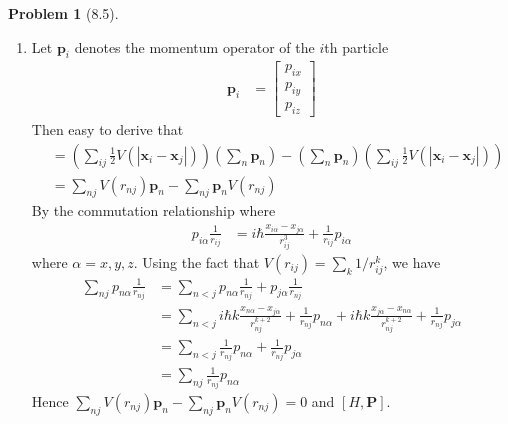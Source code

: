 \documentclass[twoside,11pt]{article}
\theoremstyle{definition}
\newtheorem{problem}{Problem}
\theoremstyle{remark}
\begin{document}
\begin{problem}[8.5]\
\begin{enumerate}[label=(\alph*)]
\item Let $\mathbf{p}_i$ denotes the momentum operator of the $i$th particle
\begin{align*}
    \mathbf{p}_i &= \begin{bmatrix}
        p_{ix}\\ p_{iy}\\ p_{iz}
    \end{bmatrix}
\end{align*}
Then easy to derive that
\begin{align*}
    [H, \mathbf{P}] &= 
    \left(\sum_{ij}\frac{1}{2}V(|\mathbf{x}_i-\mathbf{x}_j|)\right)
    \left(\sum_n \mathbf{p}_n\right) - 
    \left(\sum_n \mathbf{p}_n\right)
    \left(\sum_{ij}\frac{1}{2}V(|\mathbf{x}_i-\mathbf{x}_j|)\right)\\
    &=
    \sum_{nj}
    V(r_{nj})
    \mathbf{p}_n
    -
    \sum_{nj}
    \mathbf{p}_n
    V(r_{nj})
\end{align*}
By the commutation relationship where
\begin{align*}
    p_{i\alpha}\frac{1}{r_{ij}} &= i\hbar\frac{x_{i\alpha} - x_{j\alpha}}{r_{ij}^3}
    + \frac{1}{r_{ij}}p_{i\alpha}
\end{align*}
where $\alpha=x, y, z$.
Using the fact that $V(r_{ij})= \sum_k 1/r^k_{ij}$,
we have
\begin{align*}
    \sum_{nj}p_{n\alpha}\frac{1}{r_{nj}} &= 
    \sum_{n<j} p_{n\alpha}\frac{1}{r_{nj}} + p_{j\alpha} \frac{1}{r_{nj}}\\
    &= \sum_{n<j}
    i\hbar k \frac{x_{n\alpha} - x_{j\alpha}}{r_{nj}^{k+2}} + \frac{1}{r_{nj}}p_{n\alpha}
    +
    i\hbar k \frac{x_{j\alpha} - x_{n\alpha}}{r_{nj}^{k+2}} + \frac{1}{r_{nj}}p_{j\alpha}\\
    &= 
    \sum_{n<j}
    \frac{1}{r_{nj}}p_{n\alpha} + \frac{1}{r_{nj}}p_{j\alpha}\\
    &= \sum_{nj} \frac{1}{r_{nj}}p_{n\alpha}
\end{align*}
Hence $\sum_{nj}
V(r_{nj})
\mathbf{p}_n
-
\sum_{nj}
\mathbf{p}_n
V(r_{nj})=0$ and $[H,\mathbf{P}]$.


\end{enumerate}
\end{problem}
\end{document}
